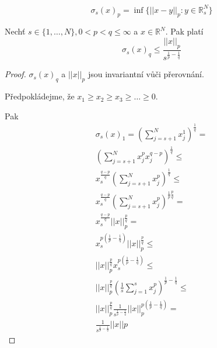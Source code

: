 \documentclass[../main.tex]{subfiles}
\begin{document}
\begin{definition}
    \begin{equation}
        \sigma_s(x)_p = \inf \{||x-y||_p : y\in \mathbb{R}^N_s \}
    \end{equation}
\end{definition}

\begin{theorem}
    Nechť $s\in \{1,\dots, N\}, 0<p<q\leq \infty$ a $x\in\mathbb{R}^N$. Pak platí
    \begin{equation}
        \sigma_s(x)_q \leq \frac{||x||_p}{s^{\frac{1}{p} - \frac{1}{q}}}
    \end{equation}
\end{theorem}

\begin{proof}\hphantom{a}

    $\sigma_s(x)_q$ a $||x||_p$ jsou invariantní vůči přerovnání. 

    Předpokládejme, že $x_1 \geq x_2 \geq x_3 \geq \dots \geq 0$.

    Pak 
    \begin{multline}
    \sigma_s(x)_1 = \left( \sum_{j = s+1}^{N} x_j^1\right)^{\frac{1}{q}} = \\
    \left(\sum_{j=s+1}^{N} x_j^p x_j^{q-p}\right)^{\frac{1}{q}} \leq \\
    x_s^{\frac{q-p}{q}} \left( \sum_{j=s+1}^{N} x_j^p \right)^{\frac{1}{q}} \leq \\
    x_s^{\frac{q-p}{q}} \left( \sum_{j=s+1}^{N} x_j^p \right)^{\frac{1}{p} \frac{p}{q}} = \\
    x_s^{\frac{q-p}{q}} ||x||_p^{\frac{p}{q}} = \\
    x_s^{p \left(\frac{1}{p} - \frac{1}{q}\right)} ||x||_p^{\frac{p}{q}} \leq \\ 
    ||x||_p^{\frac{p}{q}} x_s^{p \left(\frac{1}{p} - \frac{1}{q}\right)}\leq \\ 
    ||x||_p^{\frac{p}{q}} \left( \frac{1}{s}\sum_{j=1}^{s} x_j^p\right)^{\frac{1}{p} - \frac{1}{q}} \leq \\ 
    ||x||_p^{\frac{p}{q}} \frac{1}{s^{\frac{1}{p} - \frac{1}{q}}} ||x||_p^{p\left(\frac{1}{p} - \frac{1}{q}\right)} = \\
    \frac{1}{s^{\frac{1}{p} - \frac{1}{q}}} ||x||p
    \end{multline}
\end{proof}
\end{document}
